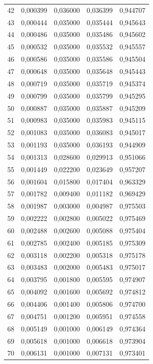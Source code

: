 \begin{small}
\begin{longtable}{rrrrr}
42 & 0,000399 & 0,036000 & 0,036399 & 0,944707 \\
43 & 0,000444 & 0,035000 & 0,035444 & 0,945643 \\
44 & 0,000486 & 0,035000 & 0,035486 & 0,945602 \\
45 & 0,000532 & 0,035000 & 0,035532 & 0,945557 \\
46 & 0,000586 & 0,035000 & 0,035586 & 0,945504 \\
47 & 0,000648 & 0,035000 & 0,035648 & 0,945443 \\
48 & 0,000719 & 0,035000 & 0,035719 & 0,945374 \\
49 & 0,000799 & 0,035000 & 0,035799 & 0,945295 \\
50 & 0,000887 & 0,035000 & 0,035887 & 0,945209 \\
51 & 0,000983 & 0,035000 & 0,035983 & 0,945115 \\
52 & 0,001083 & 0,035000 & 0,036083 & 0,945017 \\
53 & 0,001193 & 0,035000 & 0,036193 & 0,944909 \\
54 & 0,001313 & 0,028600 & 0,029913 & 0,951066 \\
55 & 0,001449 & 0,022200 & 0,023649 & 0,957207 \\
56 & 0,001604 & 0,015800 & 0,017404 & 0,963329 \\
57 & 0,001782 & 0,009400 & 0,011182 & 0,969429 \\
58 & 0,001987 & 0,003000 & 0,004987 & 0,975503 \\
59 & 0,002222 & 0,002800 & 0,005022 & 0,975469 \\
60 & 0,002488 & 0,002600 & 0,005088 & 0,975404 \\
61 & 0,002785 & 0,002400 & 0,005185 & 0,975309 \\
62 & 0,003118 & 0,002200 & 0,005318 & 0,975178 \\
63 & 0,003483 & 0,002000 & 0,005483 & 0,975017 \\
64 & 0,003795 & 0,001800 & 0,005595 & 0,974907 \\
65 & 0,004092 & 0,001600 & 0,005692 & 0,974812 \\
66 & 0,004406 & 0,001400 & 0,005806 & 0,974700 \\
67 & 0,004751 & 0,001200 & 0,005951 & 0,974558 \\
68 & 0,005149 & 0,001000 & 0,006149 & 0,974364 \\
69 & 0,005618 & 0,001000 & 0,006618 & 0,973904 \\
70 & 0,006131 & 0,001000 & 0,007131 & 0,973401 \\

\end{longtable}
\end{small}

